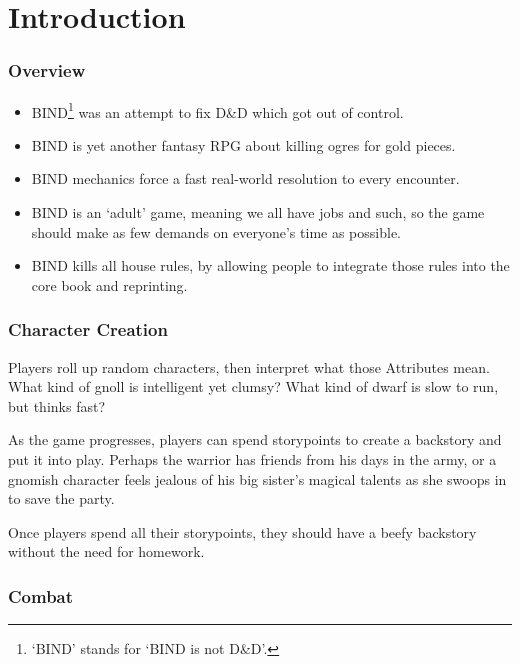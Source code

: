 \chapter*{Introduction}

\begin{multicols}{2}

\subsection*{Overview}

\begin{itemize}

  \item
  BIND\footnote{`BIND' stands for `BIND is not D\&D'.} was an attempt to fix D\&D which got out of control.
  \item
  BIND is yet another fantasy RPG about killing ogres for gold pieces.
  \item
  BIND mechanics force a fast real-world resolution to every encounter.
  \item
  BIND is an `adult' game, meaning we all have jobs and such, so the game should make as few demands on everyone's time as possible.
  \item
  BIND kills all house rules, by allowing people to integrate those rules into the core book and reprinting.

\end{itemize}

\subsection*{Character Creation}

Players roll up random characters, then interpret what those Attributes mean.
What kind of gnoll is intelligent yet clumsy?
What kind of dwarf is slow to run, but thinks fast?

As the game progresses, players can spend \glspl{storypoint} to create a backstory and put it into play.
Perhaps the warrior has friends from his days in the army, or a gnomish character feels jealous of his big sister's magical talents as she swoops in to save the party.

Once players spend all their \glspl{storypoint}, they should have a beefy backstory without the need for homework.

\subsection*{Combat}


\end{multicols}
